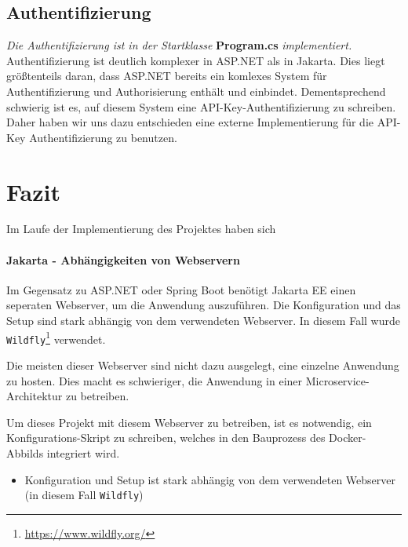 \subsection{Authentifizierung}

\textit{Die Authentifizierung ist in der Startklasse} \textbf{Program.cs} \textit{implementiert.}\\

Authentifizierung ist deutlich komplexer in ASP.NET als in Jakarta. Dies liegt größtenteils daran,
dass ASP.NET bereits ein komlexes System für Authentifizierung und Authorisierung enthält und einbindet. 
Dementsprechend schwierig ist es, auf diesem System eine API-Key-Authentifizierung zu schreiben. 
Daher haben wir uns dazu entschieden eine externe Implementierung für die API-Key Authentifizierung zu benutzen.

\section{Fazit}

Im Laufe der Implementierung des Projektes haben sich

\paragraph{Jakarta - Abhängigkeiten von Webservern}

Im Gegensatz zu ASP.NET oder Spring Boot benötigt Jakarta EE einen seperaten Webserver, um die Anwendung auszuführen. 
Die Konfiguration und das Setup sind stark abhängig von dem verwendeten Webserver. 
In diesem Fall wurde \texttt{Wildfly}\footnote{\url{https://www.wildfly.org/}} verwendet.

Die meisten dieser Webserver sind nicht dazu ausgelegt, eine einzelne Anwendung zu hosten.
Dies macht es schwieriger, die Anwendung in einer Microservice-Architektur zu betreiben.

Um dieses Projekt mit diesem Webserver zu betreiben, ist es notwendig, ein Konfigurations-Skript zu schreiben, welches in den Bauprozess des Docker-Abbilds integriert wird.

\begin{itemize}
    \item Konfiguration und Setup ist stark abhängig von dem verwendeten Webserver (in diesem Fall \texttt{Wildfly})
\end{itemize}


